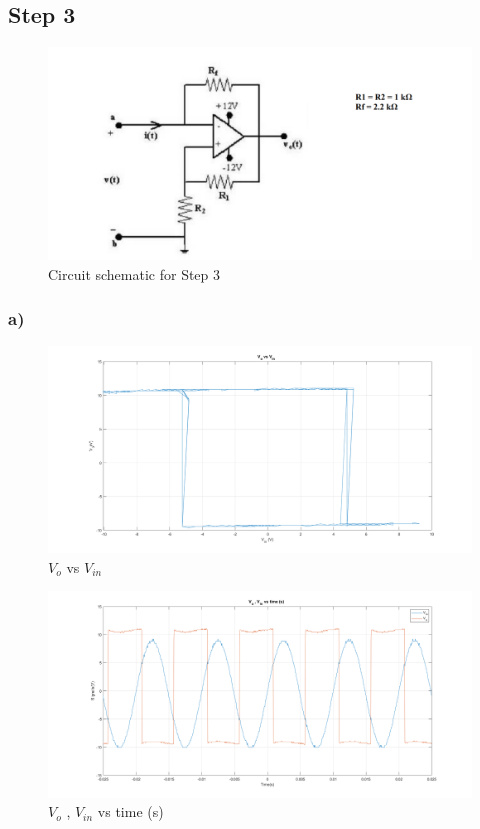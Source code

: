 \documentclass[letterpaper,12pt]{article}
\begin{document}
\subsection{Step 3}
\begin{figure}[H]
	\centering
   \includegraphics[width=1\textwidth]{circuit_5.png}
   \caption{Circuit schematic for Step 3}
\end{figure}

\subsubsection{a)}

\begin{figure}[H]
	\centering
   \includegraphics[width=1\textwidth]{3a_1.png}
   \caption{\(V_{o}\) vs \(V_{in}\)}
\end{figure}

\begin{figure}[H]
	\centering
   \includegraphics[width=1\textwidth]{3a_2.png}
   \caption{\(V_{o}\) , \(V_{in}\) vs time (s) }
\end{figure}
\end{document}
